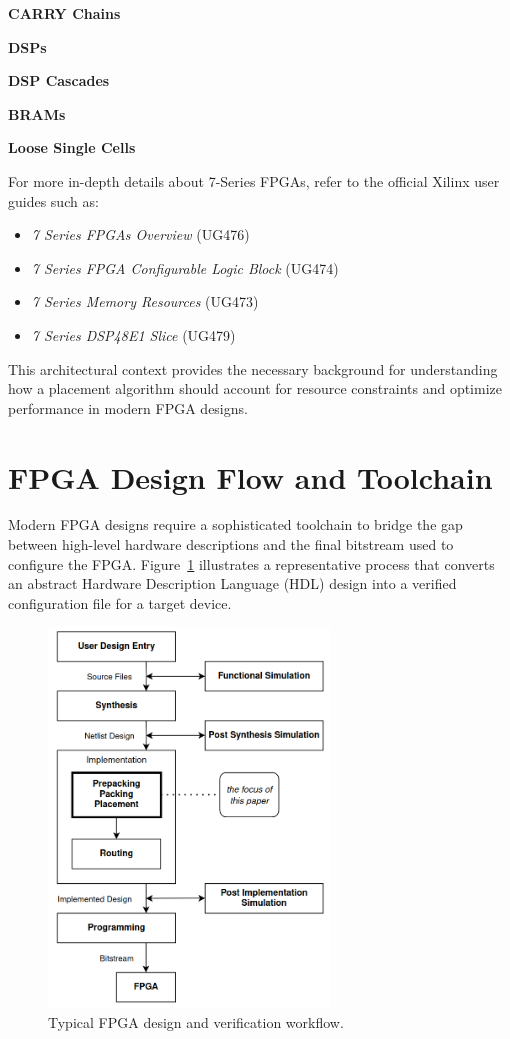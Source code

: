 \documentclass[twocolumn]{article}
\begin{document}
    \textbf{CARRY Chains} \quad

    \textbf{DSPs} \quad 

    \textbf{DSP Cascades} \quad 

    \textbf{BRAMs} \quad 

    \textbf{Loose Single Cells} \quad


    For more in-depth details about 7-Series FPGAs, refer to the official Xilinx user guides such as:
    \begin{itemize}
        \item \emph{7 Series FPGAs Overview} (UG476)
        \item \emph{7 Series FPGA Configurable Logic Block} (UG474)
        \item \emph{7 Series Memory Resources} (UG473)
        \item \emph{7 Series DSP48E1 Slice} (UG479)
    \end{itemize}

    This architectural context provides the necessary background for understanding how a placement algorithm should account for resource constraints and optimize performance in modern FPGA designs.


\section{FPGA Design Flow and Toolchain}
    \label{sec:fpga_flow_toolchain}

    Modern FPGA designs require a sophisticated toolchain to bridge the gap between high-level hardware descriptions and the final bitstream used to configure the FPGA. 
    Figure~\ref{fig:design_flow} illustrates a representative process that converts an abstract Hardware Description Language (HDL) design into a verified configuration file for a target device.

    \begin{figure}[]
    \centering
    \includegraphics[width=7.5cm]{figures/design_flow.png}
    \caption{Typical FPGA design and verification workflow.}
    \label{fig:design_flow}
    \end{figure}
\end{document}

